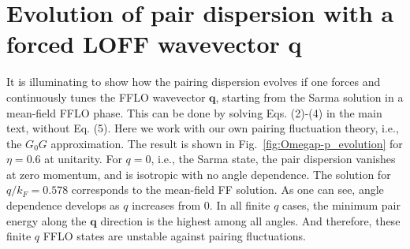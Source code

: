 \documentclass[aps,preprint,prl,floatfix]{revtex4-1}
\begin{document}



\section{Evolution of pair dispersion with a forced LOFF wavevector $\mathbf{q}$}

It is illuminating to show how the pairing dispersion evolves if one
forces and continuously tunes the FFLO wavevector $\mathbf{q}$,
starting from the Sarma solution in a mean-field FFLO phase. This can
be done by solving Eqs. (2)-(4) in the main text, without
Eq. (5). Here we work with our own pairing fluctuation theory, i.e.,
the $G_0G$ approximation. The result is shown in
Fig.~\ref{fig:Omegap-p_evolution} for $\eta = 0.6$ at unitarity. For
$q=0$, i.e., the Sarma state, the pair dispersion vanishes at zero
momentum, and is isotropic with no angle dependence.  The solution for
$q/k_F=0.578$ corresponds to the mean-field FF solution. As one can
see, angle dependence develops as $q$ increases from 0. In all finite
$q$ cases, the minimum pair energy along the $\mathbf{q}$ direction is
the highest among all angles. And therefore, these finite $q$ FFLO
states are unstable against pairing fluctuations.
\end{document}
